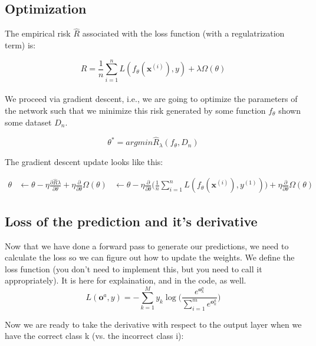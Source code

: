 \documentclass[reqno]{amsart}
\theoremstyle{definition}
\theoremstyle{remark}
\numberwithin{equation}{section}
\begin{document}
\subsection{Optimization}

The empirical risk $\hat{R}$ associated with the loss function (with a
regulatrization term) is:

\begin{equation}
    \hat{R} = \frac{1}{n}\sum_{i=1}^{n} L(f_\theta(\mathbf{x}^{(i)}),y) + \lambda\Omega(\theta)
\end{equation}\\

We proceed via gradient descent, i.e., we are going to optimize the parameters
of the network such that we minimize this risk generated by some function
$f_\theta$ shown some dataset $D_n$.

\begin{equation}
    \theta^* = argmin \hat{R}_\lambda(f_\theta, D_n)
\end{equation}

The gradient descent update looks like this:

\begin{align}
    \theta &\leftarrow \theta - \eta \frac{ \partial \hat{R} \lambda}{ \partial \theta} + \eta \frac{\partial}{\partial\theta}\Omega(\theta)
    &\leftarrow \theta - \eta \frac{\partial}{\partial\theta}
    \Bigg(\frac{1}{n}\sum_{i=1}^n  L(f_\theta(\mathbf{x}^{(i)}), y^{(1)}) \Bigg) + \eta \frac{\partial}{\partial\theta}\Omega(\theta)
\end{align}

\subsection{Loss of the prediction and it's derivative}

Now that we have done a forward pass to generate our predictions, we need to
calculate the loss so we can figure out how to update the weights. We define
the loss function (you don't need to implement this, but you need to call it
appropriately). It is here for explaination, and in the code, as well. \\

\begin{equation}
L(\mathbf{o}^a, y) = -\sum_{k=1}^M y_{k}\log \Bigg(
    \frac{e^{\mathbf{o}_k^a}}{\sum_{i=1}^m e^{\mathbf{o}_k^a}}
\Bigg)
\end{equation}

Now we are ready to take the derivative with respect to the output layer when
we have the correct class k (vs. the incorrect class i): \\
\end{document}
